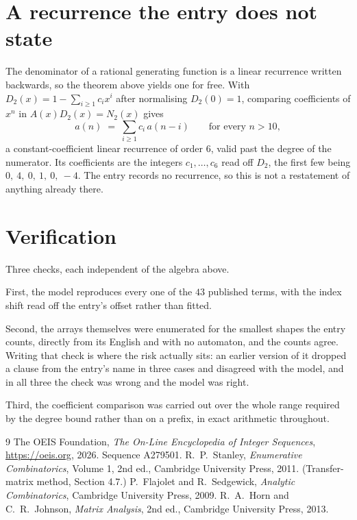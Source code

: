 \documentclass[11pt,a4paper]{article}
\theoremstyle{plain}
\theoremstyle{definition}
\begin{document}
\section{A recurrence the entry does not state}

The denominator of a rational generating function is a linear recurrence written backwards, so
the theorem above yields one for free. With $D_2(x)=1-\sum_{i\ge1}c_ix^i$ after normalising
$D_2(0)=1$, comparing coefficients of $x^n$ in $A(x)D_2(x)=N_2(x)$ gives
\[
a(n)\;=\;\sum_{i\ge1}c_i\,a(n-i)\qquad\text{for every }n>10,
\]
a constant-coefficient linear recurrence of order $6$, valid past the degree of the
numerator. Its coefficients are the integers $c_1,\dots,c_{6}$ read off $D_2$, the first few being $0,\ 4,\ 0,\ 1,\ 0,\ -4$. The entry records no recurrence, so this is not a restatement of anything
already there.

\section{Verification}

Three checks, each independent of the algebra above.

First, the model reproduces every one of the $43$ published terms, with the index shift
read off the entry's offset rather than fitted.

Second, the arrays themselves were enumerated for the smallest shapes the entry counts,
directly from its English and with no automaton, and the counts agree. Writing that check is
where the risk actually sits: an earlier version of it dropped a clause from the entry's name
in three cases and disagreed with the model, and in all three the check was wrong and the model
was right.

Third, the coefficient comparison was carried out over the whole range required by the degree
bound rather than on a prefix, in exact arithmetic throughout.

\begin{thebibliography}{9}
 The OEIS Foundation, \emph{The On-Line Encyclopedia of Integer
Sequences}, \url{https://oeis.org}, 2026. Sequence A279501.
 R.~P.~Stanley, \emph{Enumerative Combinatorics}, Volume 1, 2nd ed.,
Cambridge University Press, 2011. (Transfer-matrix method, Section 4.7.)
 P.~Flajolet and R.~Sedgewick, \emph{Analytic Combinatorics}, Cambridge
University Press, 2009.
 R.~A.~Horn and C.~R.~Johnson, \emph{Matrix Analysis}, 2nd ed., Cambridge
University Press, 2013.
\end{thebibliography}
\end{document}
